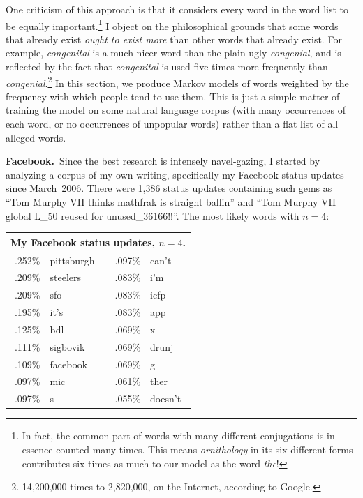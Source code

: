 \documentclass[twocolumn]{article}
\begin{document}
One criticism of this approach is that it considers every word in the
word list to be equally important.\!\footnote{In fact, the common part
  of words with many different conjugations is in essence counted many
  times. This means {\it ornithology} in its six different forms
  contributes six times as much to our model as the word {\it the}!} I
object on the philosophical grounds that some words that already exist
{\em ought to exist more} than other words that already exist. For
example, {\it congenital} is a much nicer word than the plain ugly
{\it congenial}, and is reflected by the fact that {\it congenital} is
used five times more frequently than {\it
  congenial}.\!\footnote{14,200,000 times to 2,820,000, on the
  Internet, according to Google.} In this section, we produce Markov
models of words weighted by the frequency with which people tend to
use them. This is just a simple matter of training the model on some
natural language corpus (with many occurrences of each word, or no
occurrences of unpopular words) rather than a flat list of all alleged
words.

{\bf Facebook.}\ Since the best research is intensely navel-gazing, I started by 
analyzing a corpus of my own writing, specifically my Facebook status
updates since March~2006. There were 1,386 status updates containing
such gems as ``Tom Murphy VII thinks mathfrak is straight ballin''
and ``Tom Murphy VII global L\_50 reused for unused\_36166!!''. The
most likely words with $n=4$:

\begin{center}
\begin{tabular}{rl@{\quad\quad}rl}
\multicolumn{4}{c}{My Facebook status updates, $n=4$.} \\
\hline
.252\% &  pittsburgh   & .097\% &  can't    \\   
.209\% &  steelers     & .083\% &  i'm      \\   
.209\% &  sfo          & .083\% &  icfp     \\   
.195\% &  it's         & .083\% &  app      \\   
.125\% &  bdl          & .069\% &  x        \\   
.111\% &  sigbovik     & .069\% &  drunj    \\   
.109\% &  facebook     & .069\% &  g        \\   
.097\% &  mic          & .061\% &  ther     \\   
.097\% &  s            & .055\% &  doesn't  \\
\end{tabular}
\end{center}
\end{document}
